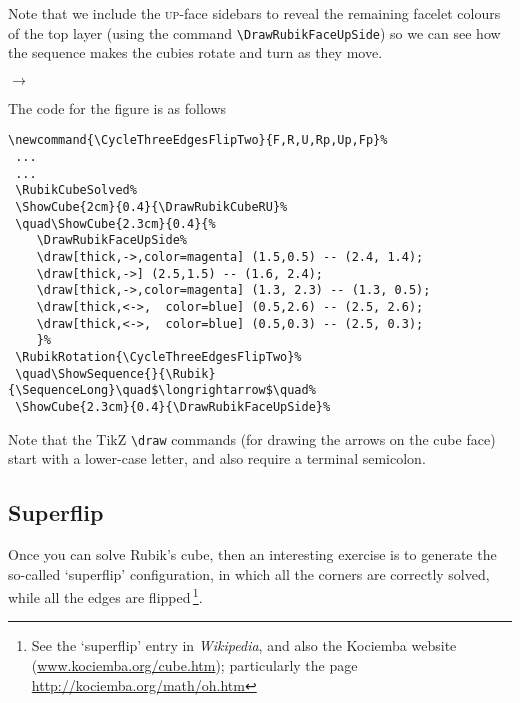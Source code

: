 \documentclass[a4paper]{article}
\newcommand{\CycleThreeEdgesFlipTwo}{[CycleThreeEdgesFlipTwo],F,R,U,Rp,Up,Fp}%
\begin{document}
Note that we  include the \textsc{up}-face sidebars to reveal the remaining 
facelet colours of the top layer (using the command \verb!\DrawRubikFaceUpSide!) 
so we can see how the  sequence makes the cubies rotate and turn as they move.

 \bigskip%
 \noindent\hfil%
 \RubikCubeSolvedWY%
 \quad{}%
 \RubikRotation{\CycleThreeEdgesFlipTwo}%
 \quad\ShowSequence{}{\Rubik}{\SequenceLong}\quad$\longrightarrow$\quad%
 \hfil%
 \bigskip%


{\noindent}The code for the figure is as follows 


\begin{verbatim}
\newcommand{\CycleThreeEdgesFlipTwo}{F,R,U,Rp,Up,Fp}%
 ...
 ...
 \RubikCubeSolved%
 \ShowCube{2cm}{0.4}{\DrawRubikCubeRU}%
 \quad\ShowCube{2.3cm}{0.4}{%
    \DrawRubikFaceUpSide%
    \draw[thick,->,color=magenta] (1.5,0.5) -- (2.4, 1.4);
    \draw[thick,->] (2.5,1.5) -- (1.6, 2.4);
    \draw[thick,->,color=magenta] (1.3, 2.3) -- (1.3, 0.5);
    \draw[thick,<->,  color=blue] (0.5,2.6) -- (2.5, 2.6);
    \draw[thick,<->,  color=blue] (0.5,0.3) -- (2.5, 0.3);
    }%
 \RubikRotation{\CycleThreeEdgesFlipTwo}%
 \quad\ShowSequence{}{\Rubik}{\SequenceLong}\quad$\longrightarrow$\quad%
 \ShowCube{2.3cm}{0.4}{\DrawRubikFaceUpSide}%
\end{verbatim}

{\noindent}Note that the  TikZ  \verb!\draw! commands (for drawing the arrows 
on the cube face) start with a lower-case letter, and also require a terminal 
semicolon.




\pagebreak
\subsection{Superflip}


Once you can solve Rubik's cube, then an interesting exercise  is to generate  
the so-called `superflip' configuration, in which all the 
corners are correctly solved, while all the edges are 
flipped\,\footnote{See the `superflip' entry in \textit{Wikipedia}, and also 
the Kociemba website (\url{www.kociemba.org/cube.htm}); particularly the page 
\url{http://kociemba.org/math/oh.htm}}. 
\end{document}

